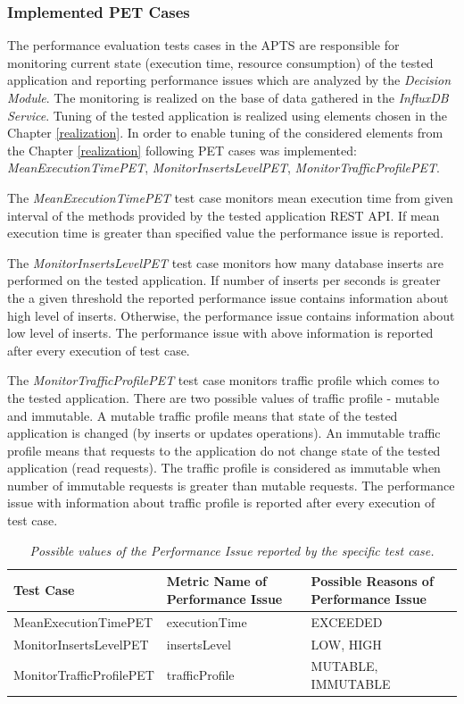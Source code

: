 \documentclass[10pt,a4paper]{article}
\begin{document}
\subsubsection{Implemented PET Cases} \label{dm}

 The performance evaluation tests cases in the APTS are responsible for monitoring current state (execution time, resource consumption) of the tested application and reporting performance issues which are analyzed by the \textit{Decision Module}. The monitoring is realized on the base of data gathered in the \textit{InfluxDB Service}.  Tuning of the tested application is realized using elements chosen in the Chapter \ref{realization}. In order to enable tuning of the considered elements from the Chapter \ref{realization} following PET cases was implemented: \textit{MeanExecutionTimePET}, \textit{MonitorInsertsLevelPET},  \textit{MonitorTrafficProfilePET}.
 
 The \textit{MeanExecutionTimePET} test case monitors mean execution time from given interval of the methods provided by the tested application REST API. If mean execution time is greater than specified value the performance issue is reported. 

The \textit{MonitorInsertsLevelPET} test case monitors how many database inserts are performed on the tested application. If number of inserts per seconds is greater the a given threshold the reported performance issue contains information about high level of inserts. Otherwise, the performance issue contains information about low level of inserts. The performance issue with above information is reported after every execution of test case. 

The \textit{MonitorTrafficProfilePET} test case monitors traffic profile which comes to the tested application. There are two possible values of traffic profile - mutable and immutable. A mutable traffic profile means that state of the tested application is changed (by inserts or updates operations). An immutable traffic profile means that requests to the application do not change state of the tested application (read requests). The traffic profile is considered as immutable when number of immutable requests is greater than mutable requests. The performance issue with information about traffic profile is reported after every execution of test case.

\begin{table}[!htb]
\def\arraystretch{1.5}
\caption{\textit{Possible values of the Performance Issue reported by the specific test case.}}\label{testcasescomp}
\begin{tabularx}{\textwidth}{X|X|p{3.8cm}}
\textbf{Test Case} & \textbf{Metric Name of Performance Issue} & \textbf{Possible Reasons of Performance Issue} \\ \hline
MeanExecutionTimePET & executionTime & EXCEEDED \\\hline
MonitorInsertsLevelPET & insertsLevel &LOW, HIGH \\\hline
MonitorTrafficProfilePET & trafficProfile & MUTABLE, IMMUTABLE \\
\end{tabularx}
\end{table}
\end{document}
